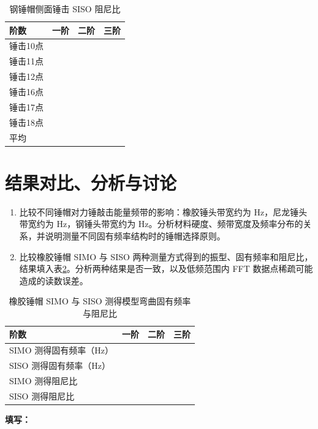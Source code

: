 \documentclass[UTF8,a4paper,12pt]{ctexart}
\newcommand{\blank}[1][2.5cm]{\mbox{\underline{\hspace{#1}}}}
\newcommand{\answer}{\par\noindent\textbf{填写：}\blank[0.86\textwidth]\par}
\numberwithin{equation}{section}
\begin{document}
\begin{table}[H]
\centering\small
\caption{钢锤帽侧面锤击 SISO 阻尼比}
\label{tab:exp4-steel-side-damping}
\begin{tabular}{lccc}
\toprule
阶数 & 一阶 & 二阶 & 三阶\\
\midrule
锤击10点 & \blank[1.5cm] & \blank[1.5cm] & \blank[1.5cm]\\
锤击11点 & \blank[1.5cm] & \blank[1.5cm] & \blank[1.5cm]\\
锤击12点 & \blank[1.5cm] & \blank[1.5cm] & \blank[1.5cm]\\
锤击16点 & \blank[1.5cm] & \blank[1.5cm] & \blank[1.5cm]\\
锤击17点 & \blank[1.5cm] & \blank[1.5cm] & \blank[1.5cm]\\
锤击18点 & \blank[1.5cm] & \blank[1.5cm] & \blank[1.5cm]\\
平均 & \blank[1.5cm] & \blank[1.5cm] & \blank[1.5cm]\\
\bottomrule
\end{tabular}
\end{table}

\section{结果对比、分析与讨论}
\begin{enumerate}
  \item 比较不同锤帽对力锤敲击能量频带的影响：橡胶锤头带宽约为\blank[1.5cm] Hz，尼龙锤头带宽约为\blank[1.5cm] Hz，钢锤头带宽约为\blank[1.5cm] Hz。分析材料硬度、频带宽度及频率分布的关系，并说明测量不同固有频率结构时的锤帽选择原则。
  \item 比较橡胶锤帽 SIMO 与 SISO 两种测量方式得到的振型、固有频率和阻尼比，结果填入表\ref{tab:exp4-compare-simo-siso}。分析两种结果是否一致，以及低频范围内 FFT 数据点稀疏可能造成的读数误差。
\end{enumerate}

\begin{table}[H]
\centering
\caption{橡胶锤帽 SIMO 与 SISO 测得模型弯曲固有频率与阻尼比}
\label{tab:exp4-compare-simo-siso}
\begin{tabular}{lccc}
\toprule
阶数 & 一阶 & 二阶 & 三阶\\
\midrule
SIMO 测得固有频率（Hz） & \blank[1.6cm] & \blank[1.6cm] & \blank[1.6cm]\\
SISO 测得固有频率（Hz） & \blank[1.6cm] & \blank[1.6cm] & \blank[1.6cm]\\
SIMO 测得阻尼比 & \blank[1.6cm] & \blank[1.6cm] & \blank[1.6cm]\\
SISO 测得阻尼比 & \blank[1.6cm] & \blank[1.6cm] & \blank[1.6cm]\\
\bottomrule
\end{tabular}
\end{table}
\answer
\end{document}
